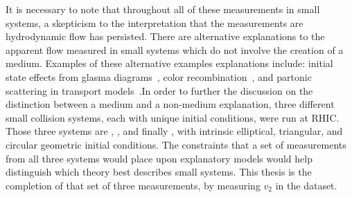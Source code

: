 It is necessary to note that throughout all of these measurements in small systems, a skepticism to the interpretation that the measurements are hydrodynamic flow has persisted. There are alternative explanations to the apparent flow measured in small systems which do not involve the creation of a medium. Examples of these alternative examples explanations include: initial state effects from glasma diagrams~\cite{PhysRevLett.108.262001}, color recombination~\cite{PhysRevLett.111.042001}, and partonic scattering in transport models~\cite{PhysRevLett.113.252301}.In order to further the discussion on the distinction between a medium and a non-medium explanation, three different small collision systems, each with unique initial conditions, were run at RHIC. Those three systems are \dau, \hau, and finally \pau, with intrinsic  elliptical, triangular, and circular geometric initial conditions. The constraints that a set of measurements from all three systems would place upon explanatory models would help distinguish which theory best describes small systems. This thesis is the completion of that set of three measurements, by measuring $v_2$ in the \pau dataset.






